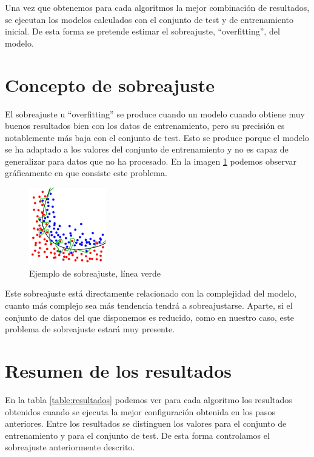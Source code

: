 Una vez que obtenemos para cada algoritmos la mejor combinación de resultados, se ejecutan los modelos calculados con el conjunto de test y de entrenamiento inicial. De esta forma se pretende estimar el sobreajuste, ``overfitting'', del modelo. 

\section{Concepto de sobreajuste}
\label{section:sobreajuste}
El sobreajuste u ``overfitting'' se produce cuando un modelo cuando obtiene muy buenos resultados bien con los datos de entrenamiento, pero su precisión es notablemente más baja con el conjunto de test. Esto se produce porque el modelo se ha adaptado a los valores del conjunto de entrenamiento y no es capaz de generalizar para datos que no ha procesado. En la imagen \ref{figure:sobreajuste} podemos observar gráficamente en que consiste este problema.

\begin{figure}[H]
\centering
\includegraphics[width=0.3\textwidth]{figs/Overfitting.png}
\caption{Ejemplo de sobreajuste, línea verde \cite{SobreajusteLibre}}
\label{figure:sobreajuste}
\end{figure}

Este sobreajuste está directamente relacionado con la complejidad del modelo, cuanto más complejo sea más tendencia tendrá a sobreajustarse. Aparte, si el conjunto de datos del que disponemos es reducido, como en nuestro caso, este problema de sobreajuste estará muy presente.

\section{Resumen de los resultados}

En la tabla \ref{table:resultados} podemos ver para cada algoritmo los resultados obtenidos cuando se ejecuta la mejor configuración obtenida en los pasos anteriores. Entre los resultados se distinguen los valores para el conjunto de entrenamiento y para el conjunto de test. De esta forma controlamos el sobreajuste anteriormente descrito.


